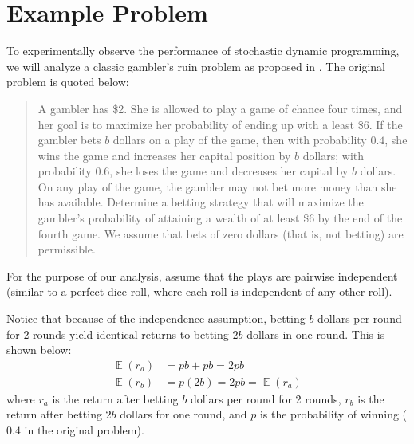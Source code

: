 \documentclass[conference]{IEEEtran}
\DeclareMathOperator*{\E}{\mathbb{E}}
\begin{document}
\section{Example Problem}

To experimentally observe the performance of stochastic dynamic programming, we will analyze a classic gambler's ruin problem as proposed in \cite{winston2004operations}. The original problem is quoted below:
\begin{quote}
A gambler has \$2. She is allowed to play a game of chance four times, and her goal is to maximize her probability of ending up with a least \$6. If the gambler bets $b$ dollars on a play of the game, then with probability $0.4$, she wins the game and increases her capital position by $b$ dollars; with probability $0.6$, she loses the game and decreases her capital by $b$ dollars. On any play of the game, the gambler may not bet more money than she has available. Determine a betting strategy that will maximize the gambler’s probability of attaining a wealth of at least \$6 by the end of the fourth game. We assume that bets of zero dollars (that is, not betting) are permissible.
\end{quote}
For the purpose of our analysis, assume that the plays are pairwise independent (similar to a perfect dice roll, where each roll is independent of any other roll).

Notice that because of the independence assumption, betting $b$ dollars per round for 2 rounds yield identical returns to betting $2b$ dollars in one round. This is shown below:
\begin{equation}
\begin{aligned}
\E(r_a) &= pb+pb = 2pb\\
\E(r_b) &= p(2b) = 2pb = \E(r_a)
\end{aligned}
\end{equation}
where $r_a$ is the return after betting $b$ dollars per round for 2 rounds, $r_b$ is the return after betting $2b$ dollars for one round, and $p$ is the probability of winning ($0.4$ in the original problem).
\end{document}
